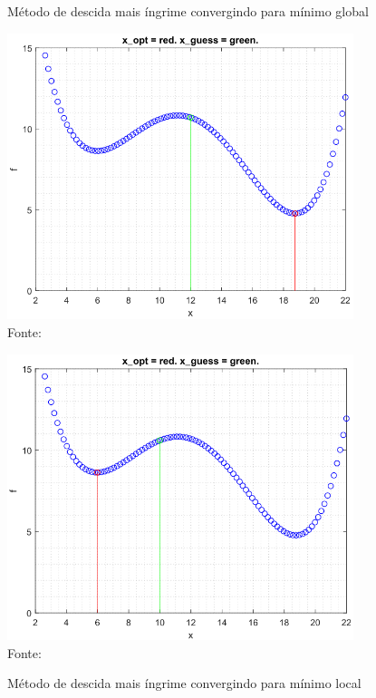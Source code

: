 \begin{figure}[h]
    \centering
    \begin{minipage}{0.47\textwidth}
		\caption{Método de descida mais íngrime convergindo para mínimo global}
        \centering
        \includegraphics[width=0.9\textwidth]{./5_images/steepest_descent_global_minimum.png} 
		\label{fig:steepest_descent_global_minimum}
		Fonte: 
    \end{minipage}\hfill
    \begin{minipage}{0.47\textwidth}
		\caption{Método de descida mais íngrime convergindo para mínimo local}  
        \centering
        \includegraphics[width=0.9\textwidth]{./5_images/steepest_descent_local_minimum.png} 
		\label{fig:steepest_descent_local_minimum}		      
		Fonte: 
	\end{minipage}
\end{figure}

